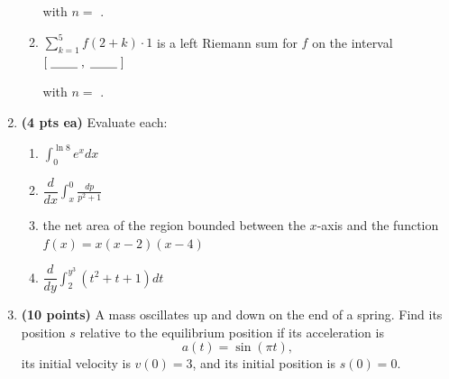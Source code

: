 \documentclass[12pt,letterpaper]{article}
\begin{document}
\begin{enumerate}[1.]
\begin{enumerate}
	\hspace{8pc}with $n=$ \underline{\hspace{5ex}} .
	
	\vspace{15pc}
	\item $\displaystyle\sum_{k=1}^{5}f(2+k)\cdot 1$ is a left
	Riemann sum for $f$ on the interval $\left[\;\underline{\hspace{5ex}}\;,\;\underline{\hspace{5ex}}\;\right]$
	
	\hspace{8pc}with $n=$ \underline{\hspace{5ex}} .
	\end{enumerate}
	
\newpage
\item {\bf (4 pts ea)} Evaluate each:

	\vspace{0.5pc}
	\begin{enumerate}
	\item $\displaystyle\int_0^{\ln 8}e^xdx$
	
	\vspace{20pc}
	\item $\dfrac{d}{dx}\displaystyle\int_x^0\frac{dp}{p^2+1}$
	
	\newpage
	\item the net area of the region bounded between the $x$-axis and the function $f(x)=x(x-2)(x-4)$
	
	\vspace{27pc}
	\item $\dfrac{d}{dy}\displaystyle\int_2^{y^3}(t^2+t+1)dt$
	\end{enumerate}	

\newpage
\item {\bf (10 points)} A mass oscillates up and down on the end of a spring.  Find its position $s$ relative to the equilibrium position if its acceleration is
\[a(t)=\sin{(\pi t)},\]
its initial velocity is $v(0)=3$, and its initial position is $s(0)=0$. 	

\end{enumerate}
\end{document}
